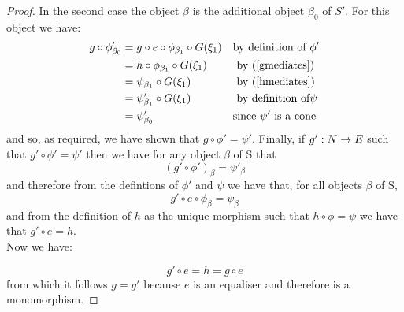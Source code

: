 \documentclass[10pt,a4paper]{article}
\begin{document}
\begin{proof}
\noindent
In the second case the object $\beta$ is the additional object $\beta_0$ of $S'$. For this object we have:
\begin{align*}
g \circ \phi'_{\beta_0}
   & = g \circ e \circ \phi_{\beta_1} \circ G(\xi_1)  && \mbox{by definition of }\phi' \\ 
             & = h \circ \phi_{\beta_1} \circ G(\xi_1) && \mbox{ by (\ref{gmediates})} \\
             & = \psi_{\beta_1}  \circ G(\xi_1)       && \mbox{ by (\ref{hmediates})} \\
						 & = \psi'_{\beta_1} \circ G(\xi_1)       && \mbox{ by definition of} \psi \\
						& = \psi'_{\beta_0}                        && \mbox{since }\psi' \mbox{ is a cone} \\ 
\end{align*}
and so, as required, we have shown that 
$g \circ \phi' = \psi'$.
\noindent Finally, if $g':N \rightarrow E$ such that $g' \circ \phi' = \psi'$ then we have 
for any object $\beta$ of S that
$$(g'\circ\phi')_\beta = \psi'_\beta$$
\noindent
and therefore from the defintions of $\phi'$ and $\psi$ we have
that, for all objects $\beta$ of S,
$$
g' \circ e \circ \phi_\beta = \psi_\beta
$$
\noindent
and  from the definition of $h$ as the unique morphism such that
$h \circ \phi = \psi$ we have that 
$g' \circ e = h$.\\

\noindent
Now we have:
 
$$g' \circ e = h = g \circ e$$
from which it follows $g=g'$ because $e$ is an equaliser and therefore is a monomorphism. 
\end{proof}


\end{document}
